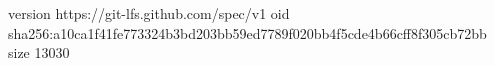 version https://git-lfs.github.com/spec/v1
oid sha256:a10ca1f41fe773324b3bd203bb59ed7789f020bb4f5cde4b66cff8f305cb72bb
size 13030
